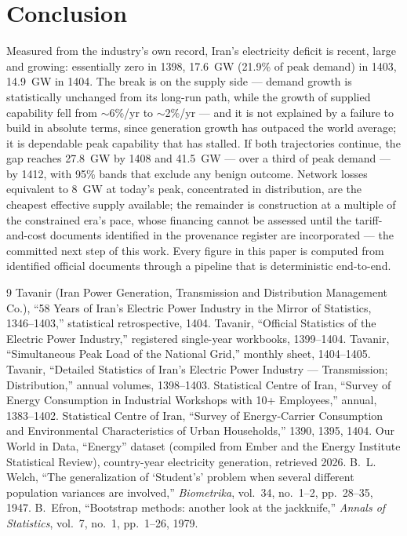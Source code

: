 \documentclass[conference]{IEEEtran}
\begin{document}
\section{Conclusion}
Measured from the industry's own record, Iran's electricity deficit is recent, large and growing: essentially zero in 1398, 17.6~GW (21.9\% of peak demand) in 1403, 14.9~GW in 1404. The break is on the supply side --- demand growth is statistically unchanged from its long-run path, while the growth of supplied capability fell from $\sim$6\%/yr to $\sim$2\%/yr --- and it is not explained by a failure to build in absolute terms, since generation growth has outpaced the world average; it is dependable peak capability that has stalled. If both trajectories continue, the gap reaches 27.8~GW by 1408 and 41.5~GW --- over a third of peak demand --- by 1412, with 95\% bands that exclude any benign outcome. Network losses equivalent to 8~GW at today's peak, concentrated in distribution, are the cheapest effective supply available; the remainder is construction at a multiple of the constrained era's pace, whose financing cannot be assessed until the tariff-and-cost documents identified in the provenance register are incorporated --- the committed next step of this work. Every figure in this paper is computed from identified official documents through a pipeline that is deterministic end-to-end.

\begin{thebibliography}{9}
 Tavanir (Iran Power Generation, Transmission and Distribution Management Co.), ``58 Years of Iran's Electric Power Industry in the Mirror of Statistics, 1346--1403,'' statistical retrospective, 1404.
 Tavanir, ``Official Statistics of the Electric Power Industry,'' registered single-year workbooks, 1399--1404.
 Tavanir, ``Simultaneous Peak Load of the National Grid,'' monthly sheet, 1404--1405.
 Tavanir, ``Detailed Statistics of Iran's Electric Power Industry --- Transmission; Distribution,'' annual volumes, 1398--1403.
 Statistical Centre of Iran, ``Survey of Energy Consumption in Industrial Workshops with 10+ Employees,'' annual, 1383--1402.
 Statistical Centre of Iran, ``Survey of Energy-Carrier Consumption and Environmental Characteristics of Urban Households,'' 1390, 1395, 1404.
 Our World in Data, ``Energy'' dataset (compiled from Ember and the Energy Institute Statistical Review), country-year electricity generation, retrieved 2026.
 B.~L. Welch, ``The generalization of `Student's' problem when several different population variances are involved,'' \emph{Biometrika}, vol.~34, no.~1--2, pp.~28--35, 1947.
 B.~Efron, ``Bootstrap methods: another look at the jackknife,'' \emph{Annals of Statistics}, vol.~7, no.~1, pp.~1--26, 1979.
\end{thebibliography}
\end{document}
